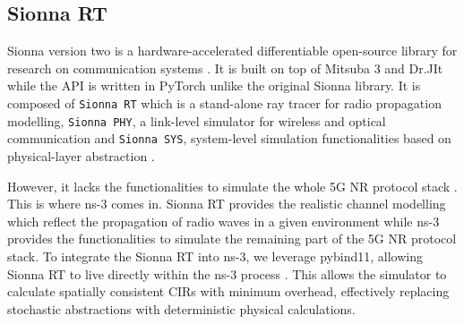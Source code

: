\subsection{Sionna RT}
Sionna version two is a hardware-accelerated differentiable open-source library for research on communication systems \cite{sionna,sionnart}.
It is built on top of Mitsuba 3 and Dr.JIt while the API is written in PyTorch unlike the original Sionna library.
It is composed of \texttt{Sionna RT} which is a stand-alone ray tracer for radio propagation modelling, \texttt{Sionna PHY}, a link-level simulator for wireless and optical communication and \texttt{Sionna SYS}, system-level simulation functionalities based on physical-layer abstraction \cite{sionna,sionnart}.

However, it lacks the functionalities to simulate the whole 5G NR protocol stack \cite{sionna,sionnart,5glena}. This is where ns-3 comes in.
Sionna RT provides the realistic channel modelling which reflect the propagation of radio waves in a given environment while ns-3 provides the functionalities to simulate the remaining part of the 5G NR protocol stack.
To integrate the Sionna RT into ns-3, we leverage pybind11, allowing Sionna RT to live directly within the ns-3 process \cite{pybind11,sionna,sionnart}.
This allows the simulator to calculate spatially consistent CIRs with minimum overhead, effectively replacing stochastic abstractions with deterministic physical calculations.
